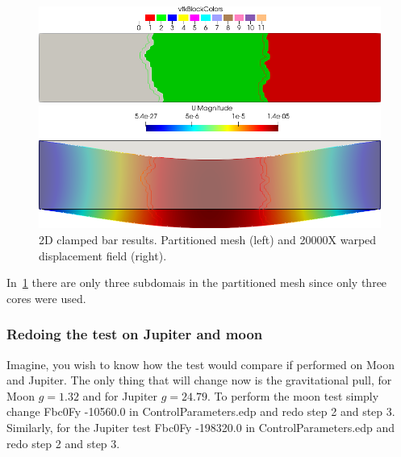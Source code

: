 \begin{figure}[htbp]
    \centering
    \begin{minipage}[t][2cm][t]{0.4\textwidth}
    \includegraphics[align=t,width=1\textwidth]{./Images/2d-bar-partitioned3.png}
    \end{minipage}\hspace{.1\textwidth}
    \begin{minipage}[t][2cm][t]{0.4\textwidth}
    \includegraphics[align=t,width=1\textwidth]{./Images/2d-bar-clamped-ends.png}
    \end{minipage}
    \caption{2D clamped bar results. Partitioned mesh (left) and 20000X warped displacement field (right).}
    \label{fig:3part}
\end{figure}

In~\cref{fig:3part} there are only three subdomais in the partitioned mesh since only three cores were used.

\subsubsection{Redoing the test on Jupiter and moon}

Imagine, you wish to know how the test would compare if performed on Moon and Jupiter. The only thing that will change now is the gravitational pull, for Moon $g=1.32$ and for Jupiter $g=24.79$. To perform the moon test simply change  {\ttfamily Fbc0Fy -10560.0} in {\ttfamily ControlParameters.edp} and redo step 2 and step 3. Similarly, for the Jupiter test {\ttfamily Fbc0Fy -198320.0} in {\ttfamily ControlParameters.edp} and redo step 2 and step 3.

